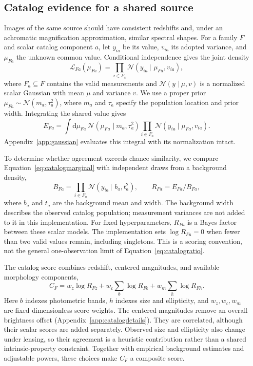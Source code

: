 \documentclass[twocolumn,twocolappendix,linenumbers]{aastex701}
\newcommand{\N}{\mathcal{N}}
\newcommand{\dd}{\mathrm{d}}
\begin{document}
\subsection{Catalog evidence for a shared source}
\label{sec:catalog}
Images of the same source should have consistent redshifts and, under an achromatic magnification approximation, similar spectral shapes.
For a family $F$ and scalar catalog component $a$, let $y_{ia}$ be its value, $v_{ia}$ its adopted variance, and $\mu_{Fa}$ the unknown common value.
Conditional independence gives the joint density
\begin{equation}
 \mathcal L_{Fa}(\mu_{Fa})=
 \prod_{i\in F_a}\N(y_{ia}\mid\mu_{Fa},v_{ia}),
 \label{eq:catalogjoint}
\end{equation}
where $F_a\subseteq F$ contains the valid measurements and $\N(y\mid\mu,v)$ is a normalized scalar Gaussian with mean $\mu$ and variance $v$.
We use a proper prior $\mu_{Fa}\sim\N(m_a,\tau_a^2)$, where $m_a$ and $\tau_a$ specify the population location and prior width.
Integrating the shared value gives
\begin{equation}
 E_{Fa}=\int\dd\mu_{Fa}\,
 \N(\mu_{Fa}\mid m_a,\tau_a^2)
 \prod_{i\in F_a}\N(y_{ia}\mid\mu_{Fa},v_{ia}).
 \label{eq:catalogmarginal}
\end{equation}
Appendix~\ref{app:gaussian} evaluates this integral with its normalization intact.

To determine whether agreement exceeds chance similarity, we compare Equation~\ref{eq:catalogmarginal} with independent draws from a background density,
\begin{equation}
 B_{Fa}=\prod_{i\in F_a}\N(y_{ia}\mid b_a,t_a^2),
 \qquad R_{Fa}=E_{Fa}/B_{Fa},
 \label{eq:catalogratio}
\end{equation}
where $b_a$ and $t_a$ are the background mean and width.
The background width describes the observed catalog population; measurement variances are not added to it in this implementation.
For fixed hyperparameters, $R_{Fa}$ is a Bayes factor between these scalar models.
The implementation sets $\log R_{Fa}=0$ when fewer than two valid values remain, including singletons.
This is a scoring convention, not the general one-observation limit of Equation~\ref{eq:catalogratio}.

The catalog score combines redshift, centered magnitudes, and available morphology components,
\begin{equation}
 C_F=w_z\log R_{Fz}
       +w_c\sum_b\log R_{Fb}
       +w_m\sum_h\log R_{Fh}.
 \label{eq:catalogscore}
\end{equation}
Here $b$ indexes photometric bands, $h$ indexes size and ellipticity, and $w_z,w_c,w_m$ are fixed dimensionless score weights.
The centered magnitudes remove an overall brightness offset (Appendix~\ref{app:catalogdetails}).
They are correlated, although their scalar scores are added separately.
Observed size and ellipticity also change under lensing, so their agreement is a heuristic contribution rather than a shared intrinsic-property constraint.
Together with empirical background estimates and adjustable powers, these choices make $C_F$ a composite score.
\end{document}
